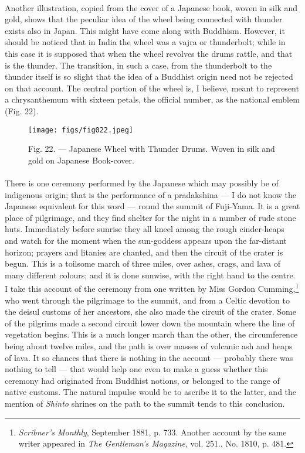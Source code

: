 \documentclass[a4paper, 11pt, oneside, polutonikogreek, english]{article}
\begin{document}
\paragraph{}
Another illustration, copied from the cover of a Japanese book, woven in silk and gold, shows that the peculiar idea of the wheel being connected with thunder exists also in Japan. This might have come along with Buddhism. However, it should be noticed that in India the wheel was a vajra or thunderbolt; while in this case it is supposed that when the wheel revolves the drums rattle, and that is the thunder. The transition, in such a case, from the thunderbolt to the thunder itself is so slight that the idea of a Buddhist origin need not be rejected on that account. The central portion of the wheel is, I believe, meant to represent a chrysanthemum with sixteen petals, the official number, as the national emblem (Fig. 22).

\begin{figure}[H]
\centering
\texttt{[image: figs/fig022.jpeg]}
\caption[Fig. 22. --- Japanese Wheel with Thunder Drums.]{Fig. 22. --- Japanese Wheel with Thunder Drums. Woven in silk and gold on Japanese Book-cover.}
\end{figure}
\paragraph{}
There is one ceremony performed by the Japanese which may possibly be of indigenous origin; that is the performance of a pradakshina --- I do not know the Japanese equivalent for this word --- round the summit of Fuji-Yama. It is a great place of pilgrimage, and they find shelter for the night in a number of rude stone huts. Immediately before sunrise they all kneel among the rough cinder-heaps and watch for the moment when the sun-goddess appears upon the far-distant horizon; prayers and litanies are chanted, and then the circuit of the crater is begun. This is a toilsome march of three miles, over ashes, crags, and lava of many different colours; and it is done sunwise, with the right hand to the centre. I take this account of the ceremony from one written by Miss Gordon Cumming,\footnote{\emph{Scribner's Monthly}, September 1881, p. 733. Another account by the same writer appeared in \emph{The Gentleman's Magazine}, vol. 251., No. 1810, p. 481.} who went through the pilgrimage to the summit, and from a Celtic devotion to the deisul customs of her ancestors, she also made the circuit of the crater. Some of the pilgrims made a second circuit lower down the mountain where the line of vegetation begins. This is a much longer march than the other, the circumference being about twelve miles, and the path is over masses of volcanic ash and heaps of lava. It so chances that there is nothing in the account --- probably there was nothing to tell --- that would help one even to make a guess whether this ceremony had originated from Buddhist notions, or belonged to the range of native customs. The natural impulse would be to ascribe it to the latter, and the mention of \emph{Shinto} shrines on the path to the summit tends to this conclusion.
\clearpage
\end{document}
